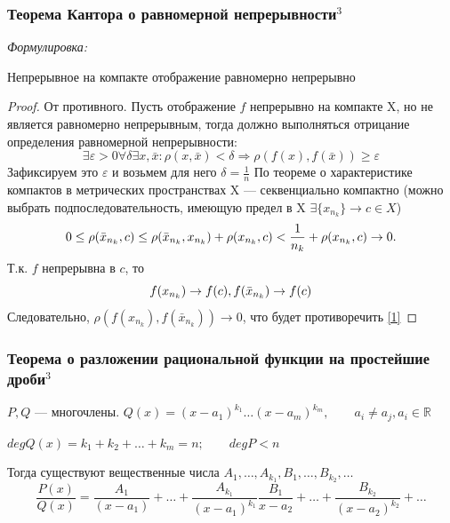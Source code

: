 \documentclass{article}
\begin{document}
\subsubsection{Теорема Кантора о равномерной непрерывности\texorpdfstring{$^3$}{}}

\textit{Формулировка: }
    
Непрерывное на компакте отображение равномерно непрерывно

\begin{proof}
От противного. Пусть отображение $f$ непрерывно на компакте X, но не является равномерно непрерывным, тогда должно выполняться отрицание определения равномерной непрерывности:
\begin{equation} \label{1}
\exists \varepsilon>0 \forall \delta \exists x,\bar{x}: \rho(x, \bar{x}) < \delta \Rightarrow \rho(f(x), f(\bar{x})) \geq \varepsilon
\end{equation}
Зафиксируем это $ \varepsilon$ и возьмем для него $\delta = \frac{1}{n}$
По теореме о характеристике компактов в метрических пространствах X --- секвенциально компактно (можно выбрать подпоследовательность, имеющую предел в X $\exists \{x_{n_k}\} \rightarrow c \in X$)
\begin{equation}
0 \leq \rho(\bar{x}_{n_k}, c) \leq \rho(\bar{x}_{n_k}, x_{n_k}) + \rho(x_{n_k}, c) < \frac{1}{n_k} +\rho(x_{n_k}, c) \rightarrow 0. \notag
\end{equation}
Т.к. $f$ непрерывна в $c$, то
\begin{equation}
f(x_{n_k}) \rightarrow f(c), f(\bar{x}_{n_k}) \rightarrow f(c) \notag
\end{equation}
Следовательно, $\rho(f(x_{n_k}), f(\bar{x}_{n_k})) \rightarrow 0$, что будет противоречить \eqref{1}
\end{proof}

\subsubsection{Теорема о разложении рациональной функции на простейшие дроби\texorpdfstring{$^3$}{}}
$P, Q$ --- многочлены. $Q(x) = (x-a_1)^{k_1}\ldots(x-a_m)^{k_m}, \qquad a_i \neq a_j, a_i \in \mathbb{R}$

$deg Q(x) = k_1 + k_2 + \ldots + k_m = n;\qquad deg P < n$

Тогда существуют вещественные числа $A_1, \ldots, A_{k_1}, B_1, \ldots, B_{k_2}, \ldots$
\begin{equation*}
\frac{P(x)}{Q(x)} = \frac{A_1} {(x - a_1)} + \dots + \frac{A_{k_1}} {(x-a_1)^{k_1}} \frac{B_1} {x - a_2} + \dots + \frac{B_{k_2}} {(x - a_2)^{k_2}} + \dots
\end{equation*}
\end{document}
